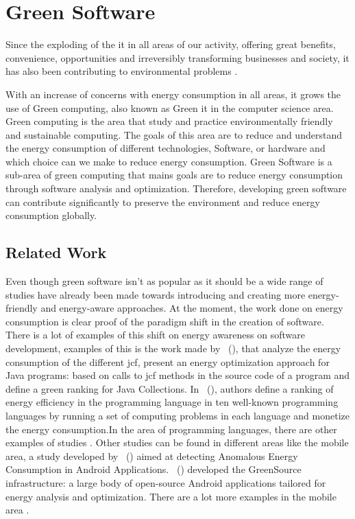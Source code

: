 \section{Green Software}
\label{sc:greensoftware}


Since the exploding of the \gls{it} in all areas of our activity, offering great benefits, convenience, opportunities and irreversibly transforming businesses and society, it has also been contributing to environmental problems \cite{makingitgreen}.

With an increase of concerns with energy consumption in all areas, it grows the use of Green computing, also known as Green \gls{it} in the computer science area. Green computing is the area that study and practice environmentally friendly and sustainable computing. The goals of this area are to reduce and understand the energy consumption of different technologies, Software, or hardware and which choice can we make to reduce energy consumption. Green Software is a sub-area of green computing that mains goals are to reduce energy consumption through software analysis and optimization. Therefore, developing green software can contribute significantly to preserve the environment and reduce energy consumption globally. 


\subsection{Related Work}


Even though green software isn't as popular as it should be a wide range of studies have already been made towards introducing and creating more energy-friendly and energy-aware approaches. At the moment, the work done on energy consumption is clear proof of the paradigm shift in the creation of software. There is a lot of examples of this shift on energy awareness on software development, examples of this is the work made by \citeauthor{javaenergy}~(\citeyear{javaenergy}), that analyze the energy consumption of the different \gls{jcf}, present an energy optimization approach for Java programs: based on calls to \gls{jcf} methods in the source code of a program and define a green ranking for Java Collections. In \citeauthor{10.1145/3125374.3125382}~(\citeyear{10.1145/3125374.3125382}), authors define a ranking of energy efficiency in the programming language in ten well-known programming languages by running a set of computing problems in each language and monetize the energy consumption.In the area of programming languages, there are other examples of studies \cite{7965265,PEREIRA2020110463,LIMA2019554,pereira2017energy,carccao2014measuring,7965316}. Other studies can be found in different areas like the mobile area, a study developed by \citeauthor{10.1007/978-3-319-11863-5_6}~(\citeyear{10.1007/978-3-319-11863-5_6}) aimed at detecting Anomalous Energy Consumption in Android Applications. \citeauthor{8816732}~(\citeyear{8816732}) developed the GreenSource infrastructure: a large body of open-source Android applications tailored for energy analysis and optimization. There are a lot more examples in the mobile area \cite{10.1145/3387905.3388600,9054858,10.1109/MSR.2019.00034,Rua2019TowardsUM,cruz2019catalog,cruzenery,7972807}.

